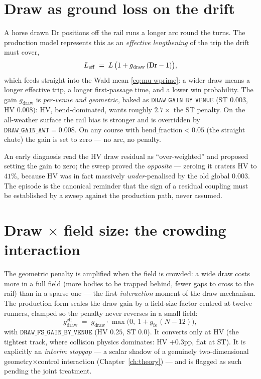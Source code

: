 \section{Draw as ground loss on the drift}

A horse drawn $\mathrm{Dr}$ positions off the rail runs a longer arc round the turns. The
production model represents this as an \emph{effective lengthening} of the trip the drift must
cover,
\begin{equation}
  {L_{\mathrm{eff}}} \;=\; L\,\bigl(1 + g_{\text{draw}}\,(\mathrm{Dr}-1)\bigr),
  \label{eq:leff}
\end{equation}
which feeds straight into the Wald mean \eqref{eq:mu-wprime}: a wider draw means a longer effective
trip, a longer first-passage time, and a lower win probability. The gain $g_{\text{draw}}$ is
\emph{per-venue and geometric}, baked as $\texttt{DRAW\_GAIN\_BY\_VENUE}$ (ST $0.003$, HV $0.008$):
HV, bend-dominated, wants roughly $2.7\times$ the ST penalty. On the all-weather surface the rail
bias is stronger and is overridden by $\texttt{DRAW\_GAIN\_AWT}=0.008$. On any course with
$\mathrm{bend\_fraction}<0.05$ (the straight chute) the gain is set to zero --- no arc, no penalty.

\begin{remark}
An early diagnosis read the HV draw residual as ``over-weighted'' and proposed setting the gain to
zero; the sweep proved the \emph{opposite} --- zeroing it craters HV to $41\%$, because HV was in
fact massively \emph{under}-penalised by the old global $0.003$. The episode is the canonical
reminder that the sign of a residual coupling must be established by a sweep against the production
path, never assumed.
\end{remark}

\section{Draw $\times$ field size: the crowding interaction}

The geometric penalty is amplified when the field is crowded: a wide draw costs more in a full
field (more bodies to be trapped behind, fewer gaps to cross to the rail) than in a sparse one ---
the first \emph{interaction} moment of the draw mechanism. The production form scales the draw gain
by a field-size factor centred at twelve runners, clamped so the penalty never reverses in a small
field:
\begin{equation}
  g_{\text{draw}}^{\text{eff}} \;=\; g_{\text{draw}}\cdot
   \max\!\bigl(0,\ 1 + g_{\text{fs}}\,(N-12)\bigr),
  \label{eq:drawfs}
\end{equation}
with $\texttt{DRAW\_FS\_GAIN\_BY\_VENUE}$ (HV $0.25$, ST $0.0$). It converts only at HV (the
tightest track, where collision physics dominates: HV $+0.3$pp, flat at ST). It is explicitly an
\emph{interim stopgap} --- a scalar shadow of a genuinely two-dimensional geometry$\times$control
interaction (Chapter~\ref{ch:theory}) --- and is flagged as such pending the joint treatment.


